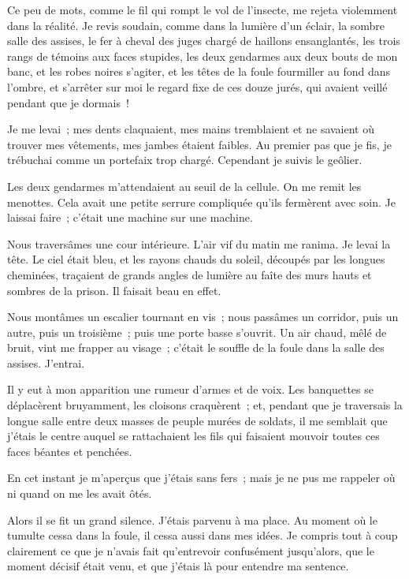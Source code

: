 \documentclass[french,twoside]{book} %
\begin{document}
Ce peu de mots, comme le fil qui rompt le vol de l’insecte, me rejeta violemment dans la réalité. Je revis soudain, comme dans la lumière d’un éclair, la sombre salle des assises, le fer à cheval des juges chargé de haillons ensanglantés, les trois rangs de témoins aux faces stupides, les deux gendarmes aux deux bouts de mon banc, et les robes noires s’agiter, et les têtes de la foule fourmiller au fond dans l’ombre, et s’arrêter  sur moi le regard fixe de ces douze jurés, qui avaient veillé pendant que je dormais !\par
Je me levai ; mes dents claquaient, mes mains tremblaient et ne savaient où trouver mes vêtements, mes jambes étaient faibles. Au premier pas que je fis, je trébuchai comme un portefaix trop chargé. Cependant je suivis le geôlier.\par
Les deux gendarmes m’attendaient au seuil de la cellule. On me remit les menottes. Cela avait une petite serrure compliquée qu’ils fermèrent avec soin. Je laissai faire ; c’était une machine sur une machine.\par
Nous traversâmes une cour intérieure. L’air vif du matin me ranima. Je levai la tête. Le ciel était bleu, et les rayons chauds du soleil, découpés par les longues cheminées, traçaient de grands angles de lumière au faîte des murs hauts et sombres de la prison. Il faisait beau en effet.\par
Nous montâmes un escalier tournant en vis ; nous passâmes un corridor, puis un autre, puis un troisième ; puis une porte basse s’ouvrit. Un air chaud, mêlé de bruit, vint me frapper au visage ; c’était le souffle de la foule dans la salle des assises. J’entrai.\par
Il y eut à mon apparition une rumeur d’armes et de voix. Les banquettes se déplacèrent bruyamment, les cloisons craquèrent ; et, pendant que je traversais la longue salle entre deux masses de peuple murées de soldats, il me semblait que j’étais le centre auquel se rattachaient les fils qui faisaient mouvoir toutes ces faces béantes et penchées.\par
En cet instant je m’aperçus que j’étais sans fers ;  mais je ne pus me rappeler où ni quand on me les avait ôtés.\par
Alors il se fit un grand silence. J’étais parvenu à ma place. Au moment où le tumulte cessa dans la foule, il cessa aussi dans mes idées. Je compris tout à coup clairement ce que je n’avais fait qu’entrevoir confusément jusqu’alors, que le moment décisif était venu, et que j’étais là pour entendre ma sentence.\par
\end{document}
